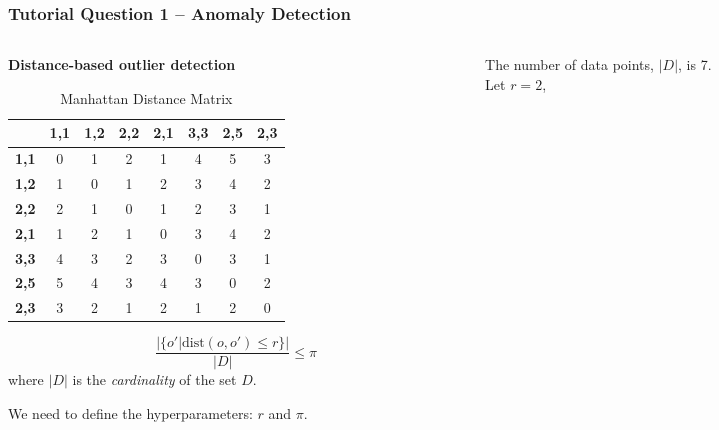 \documentclass[aspectratio=169, 10pt]{beamer}
\begin{document}
\begin{frame}[t]
    \frametitle{Tutorial Question 1 -- Anomaly Detection}
    \small
    
    \begin{columns}[t]
        \begin{column}{0.5\textwidth}
            \textbf{Distance-based outlier detection}

            \begin{table}[]
                \scriptsize
                \begin{tabular}{c|ccccccc}
                             & \textbf{1,1} & \textbf{1,2} & \textbf{2,2} & \textbf{2,1} & \textbf{3,3} & \textbf{2,5} & \textbf{2,3} \\ \hline
                \textbf{1,1} & 0            & 1            & 2            & 1            & 4            & 5            & 3            \\
                \textbf{1,2} & 1            & 0            & 1            & 2            & 3            & 4            & 2            \\
                \textbf{2,2} & 2            & 1            & 0            & 1            & 2            & 3            & 1            \\
                \textbf{2,1} & 1            & 2            & 1            & 0            & 3            & 4            & 2            \\
                \textbf{3,3} & 4            & 3            & 2            & 3            & 0            & 3            & 1            \\
                \textbf{2,5} & 5            & 4            & 3            & 4            & 3            & 0            & 2            \\
                \textbf{2,3} & 3            & 2            & 1            & 2            & 1            & 2            & 0           
                \end{tabular}
                \caption{Manhattan Distance Matrix}
            \end{table}

            \[
                \frac{|\{o' | \text{dist}(o, o') \le r\}|}{|D|} \le \pi
            \]
            where $|D|$ is the {\em cardinality} of the set $D$.\\
            \hspace*{1em}

            We need to define the hyperparameters: $r$ and $\pi$.
        \end{column}
        \begin{column}{0.5\textwidth}
            The number of data points, $|D|$, is 7.\\
            Let $r=2$,


\end{column}
\end{columns}
\end{frame}
\end{document}
